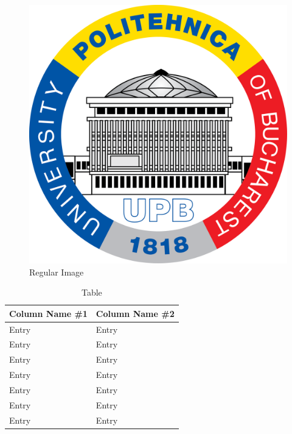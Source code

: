 \documentclass[../main.tex]{subfiles}
\begin{document}
\begin{figure}[!h]
    \centering
    \includegraphics[height=0.5\textheight]{images/theme/upb.png}
    \caption{Regular Image}
    \label{fig:landscape_image}
\end{figure}

\begin{table}[]
    \centering
    \begin{tabular}{|l|l|}
        \hline
        Column Name \#1 & Column Name \#2 \\ \hline
        Entry           & Entry           \\ \hline
        Entry           & Entry           \\ \hline
        Entry           & Entry           \\ \hline
        Entry           & Entry           \\ \hline
        Entry           & Entry           \\ \hline
        Entry           & Entry           \\ \hline
        Entry           & Entry           \\ \hline
    \end{tabular}
    \caption{Table}
    \label{tab:table}
\end{table}
\end{document}
